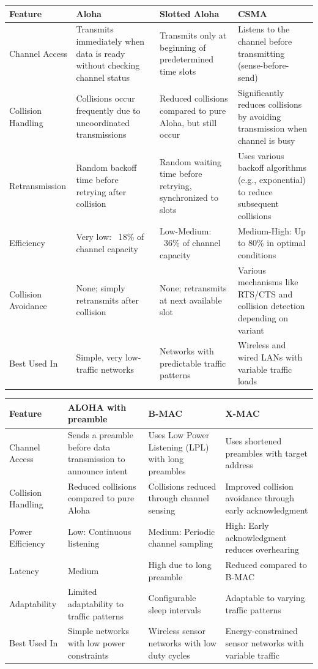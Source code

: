 \documentclass[a4paper, 9pt, landscape]{extarticle}
\begin{document}
  
  \begin{tabular}{|p{2.5cm}|p{3.5cm}|p{3.5cm}|p{3.5cm}|}
  \hline
  \rowcolor[gray]{0.8}
  \textbf{Feature} & \textbf{Aloha} & \textbf{Slotted Aloha} & \textbf{CSMA} \\
  \hline
  Channel Access & Transmits immediately when data is ready without checking channel status & Transmits only at beginning of predetermined time slots & Listens to the channel before transmitting (sense-before-send) \\
  \hline
  Collision Handling & Collisions occur frequently due to uncoordinated transmissions & Reduced collisions compared to pure Aloha, but still occur & Significantly reduces collisions by avoiding transmission when channel is busy \\
  \hline
  Retransmission & Random backoff time before retrying after collision & Random waiting time before retrying, synchronized to slots & Uses various backoff algorithms (e.g., exponential) to reduce subsequent collisions \\
  \hline
  Efficiency & Very low: ~18\% of channel capacity & Low-Medium: ~36\% of channel capacity & Medium-High: Up to 80\% in optimal conditions \\
  \hline
  Collision Avoidance & None; simply retransmits after collision & None; retransmits at next available slot & Various mechanisms like RTS/CTS and collision detection depending on variant \\
  \hline
  Best Used In & Simple, very low-traffic networks & Networks with predictable traffic patterns & Wireless and wired LANs with variable traffic loads \\
  \hline
  \end{tabular}

  
  \begin{tabular}{|p{2.5cm}|p{3.5cm}|p{3.5cm}|p{3.5cm}|}
  \hline
  \rowcolor[gray]{0.8}
  \textbf{Feature} & \textbf{ALOHA with preamble} & \textbf{B-MAC} & \textbf{X-MAC} \\
  \hline
  Channel Access & Sends a preamble before data transmission to announce intent & Uses Low Power Listening (LPL) with long preambles & Uses shortened preambles with target address \\
  \hline
  Collision Handling & Reduced collisions compared to pure Aloha & Collisions reduced through channel sensing & Improved collision avoidance through early acknowledgment \\
  \hline
  Power Efficiency & Low: Continuous listening & Medium: Periodic channel sampling & High: Early acknowledgment reduces overhearing \\
  \hline
  Latency & Medium & High due to long preamble & Reduced compared to B-MAC \\
  \hline
  Adaptability & Limited adaptability to traffic patterns & Configurable sleep intervals & Adaptable to varying traffic patterns \\
  \hline
  Best Used In & Simple networks with low power constraints & Wireless sensor networks with low duty cycles & Energy-constrained sensor networks with variable traffic \\
  \hline
  \end{tabular}
\end{document}
